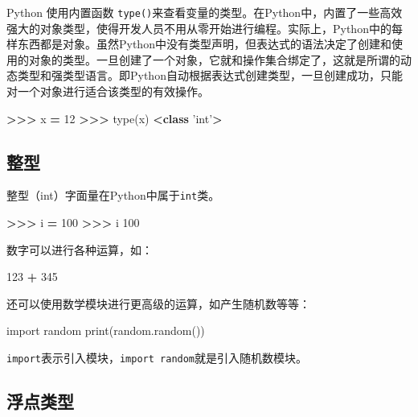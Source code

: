 \documentclass[]{ctexbook}
\newenvironment{Shaded}{\begin{snugshade}}{\end{snugshade}}
\newcommand{\BuiltInTok}[1]{#1}
\newcommand{\DecValTok}[1]{\textcolor[rgb]{0.00,0.00,0.81}{#1}}
\newcommand{\ImportTok}[1]{#1}
\newcommand{\KeywordTok}[1]{\textcolor[rgb]{0.13,0.29,0.53}{\textbf{#1}}}
\newcommand{\NormalTok}[1]{#1}
\newcommand{\OperatorTok}[1]{\textcolor[rgb]{0.81,0.36,0.00}{\textbf{#1}}}
\newcommand{\StringTok}[1]{\textcolor[rgb]{0.31,0.60,0.02}{#1}}
\begin{document}
Python 使用内置函数 \texttt{type()}来查看变量的类型。在Python中，内置了一些高效强大的对象类型，使得开发人员不用从零开始进行编程。实际上，Python中的每样东西都是对象。虽然Python中没有类型声明，但表达式的语法决定了创建和使用的对象的类型。一旦创建了一个对象，它就和操作集合绑定了，这就是所谓的动态类型和强类型语言。即Python自动根据表达式创建类型，一旦创建成功，只能对一个对象进行适合该类型的有效操作。

\begin{Shaded}
\begin{Highlighting}[]
\OperatorTok{>>>}\NormalTok{ x }\OperatorTok{=} \DecValTok{12}
\OperatorTok{>>>} \BuiltInTok{type}\NormalTok{(x)}
 \OperatorTok{<}\KeywordTok{class} \StringTok{'int'}\OperatorTok{>}
\end{Highlighting}
\end{Shaded}

\hypertarget{ux6574ux578b}{%
\subsection{整型}\label{ux6574ux578b}}

整型（int）字面量在Python中属于\texttt{int}类。

\begin{Shaded}
\begin{Highlighting}[]
\OperatorTok{>>>}\NormalTok{ i }\OperatorTok{=} \DecValTok{100}
\OperatorTok{>>>}\NormalTok{ i}
\DecValTok{100}
\end{Highlighting}
\end{Shaded}

数字可以进行各种运算，如：

\begin{Shaded}
\begin{Highlighting}[]
\DecValTok{123} \OperatorTok{+} \DecValTok{345}
\end{Highlighting}
\end{Shaded}

还可以使用数学模块进行更高级的运算，如产生随机数等等：

\begin{Shaded}
\begin{Highlighting}[]
\ImportTok{import}\NormalTok{ random}
\BuiltInTok{print}\NormalTok{(random.random())}
\end{Highlighting}
\end{Shaded}

\texttt{import}表示引入模块，\texttt{import\ random}就是引入随机数模块。

\hypertarget{ux6d6eux70b9ux7c7bux578b}{%
\subsection{浮点类型}\label{ux6d6eux70b9ux7c7bux578b}}
\end{document}
